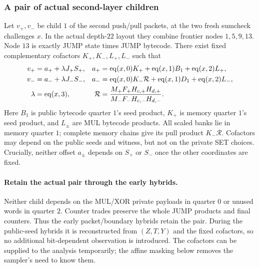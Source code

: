 \subsubsection{A pair of actual second-layer children}

Let $v_+,v_-$ be child $1$ of the second push/pull packets, at the two fresh sumcheck challenges $x$. In the actual depth-$22$ layout they combine frontier nodes $1,5,9,13$. Node $13$ is exactly JUMP state times JUMP bytecode. There exist fixed complementary cofactors $K_+,K_-,L_+,L_-$ such that
\[
\begin{aligned}
 v_+&=a_++\lambda J_+S_+,&
 a_+&=\operatorname{eq}(x,0)K_++\operatorname{eq}(x,1)B_1+\operatorname{eq}(x,2)L_+,\\
 v_-&=a_-+\lambda J_-S_-,&
 a_-&=\operatorname{eq}(x,0)K_-\mathcal R+\operatorname{eq}(x,1)D_1+\operatorname{eq}(x,2)L_-,\\
 \lambda&=\operatorname{eq}(x,3),&
 \mathcal R&=\frac{M_+F_+H_{c,+}H_{d,+}}{M_-F_-H_{c,-}H_{d,-}}.
\end{aligned}
\]
Here $B_1$ is public bytecode quarter $1$'s seed product, $K_+$ is memory quarter $1$'s seed product, and $L_\pm$ are MUL bytecode products. All scaled banks lie in memory quarter $1$; complete memory chains give its pull product $K_-\mathcal R$. Cofactors may depend on the public seeds and witness, but not on the private SET choices. Crucially, neither offset $a_\pm$ depends on $S_+$ or $S_-$ once the other coordinates are fixed.

\paragraph{Retain the actual pair through the early hybrids.} Neither child depends on the MUL/XOR private payloads in quarter $0$ or unused words in quarter $2$. Counter trades preserve the whole JUMP products and final counters. Thus the early packet/boundary hybrids retain the pair. During the public-seed hybrids it is reconstructed from $(Z,T,Y)$ and the fixed cofactors, so no additional bit-dependent observation is introduced. The cofactors can be supplied to the analysis temporarily; the affine masking below removes the sampler's need to know them.

